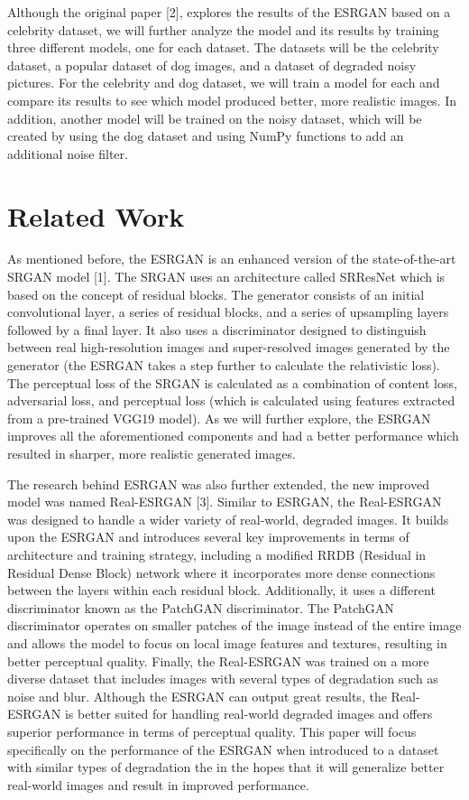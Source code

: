 \documentclass{article}
\begin{document}
Although the original paper [2], explores the results of the ESRGAN based on a celebrity dataset, we will further analyze the model and its results by training three different models, one for each dataset. The datasets will be the celebrity dataset, a popular dataset of dog images, and a dataset of degraded noisy pictures. For the celebrity and dog dataset, we will train a model for each and compare its results to see which model produced better, more realistic images. In addition, another model will be trained on the noisy dataset, which will be created by using the dog dataset and using NumPy functions to add an additional noise filter. 


\section{Related Work}
As mentioned before, the ESRGAN is an enhanced version of the state-of-the-art SRGAN model [1]. The SRGAN uses an architecture called SRResNet which is based on the concept of residual blocks. The generator consists of an initial convolutional layer, a series of residual blocks, and a series of upsampling layers followed by a final layer. It also uses a discriminator designed to distinguish between real high-resolution images and super-resolved images generated by the generator (the ESRGAN takes a step further to calculate the relativistic loss). The perceptual loss of the SRGAN is calculated as a combination of content loss, adversarial loss, and perceptual loss (which is calculated using features extracted from a pre-trained VGG19 model). As we will further explore, the ESRGAN improves all the aforementioned components and had a better performance which resulted in sharper, more realistic generated images.

The research behind ESRGAN was also further extended, the new improved model was named Real-ESRGAN [3]. Similar to ESRGAN, the Real-ESRGAN was designed to handle a wider variety of real-world, degraded images. It builds upon the ESRGAN and introduces several key improvements in terms of architecture and training strategy, including a modified RRDB (Residual in Residual Dense Block) network where it incorporates more dense connections between the layers within each residual block. Additionally, it uses a different discriminator known as the PatchGAN discriminator. The PatchGAN discriminator operates on smaller patches of the image instead of the entire image and allows the model to focus on local image features and textures, resulting in better perceptual quality. Finally, the Real-ESRGAN was trained on a more diverse dataset that includes images with several types of degradation such as noise and blur. Although the ESRGAN can output great results, the Real-ESRGAN is better suited for handling real-world degraded images and offers superior performance in terms of perceptual quality. This paper will focus specifically on the performance of the ESRGAN when introduced to a dataset with similar types of degradation the in the hopes that it will generalize better real-world images and result in improved performance.
\end{document}
